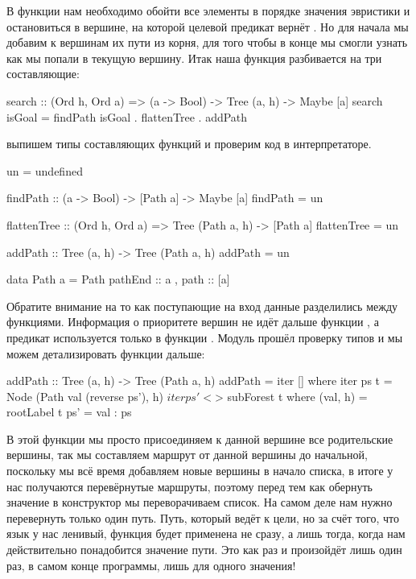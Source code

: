 В функции  нам необходимо обойти все элементы в порядке
значения эвристики и остановиться в вершине, на которой целевой предикат
вернёт . Но для начала мы добавим к вершинам их пути из корня,
для того чтобы в конце мы смогли узнать как мы попали в текущую вершину.
Итак наша функция разбивается на три составляющие:


\begin{code}
search :: (Ord h, Ord a) => (a -> Bool) -> Tree (a, h) -> Maybe [a]
search isGoal =  findPath isGoal . flattenTree . addPath 
\end{code}

выпишем типы составляющих функций и проверим код в интерпретаторе.


\begin{code}
un = undefined

findPath :: (a -> Bool) -> [Path a] -> Maybe [a]
findPath = un

flattenTree :: (Ord h, Ord a) => Tree (Path a, h) -> [Path a]
flattenTree = un

addPath :: Tree (a, h) -> Tree (Path a, h)
addPath = un

data Path a = Path 
	{ pathEnd   :: a
	, path      :: [a]
	}
\end{code}

Обратите внимание на то как поступающие на вход данные разделились между
функциями. Информация о приоритете вершин не идёт дальше функции
, а предикат  используется только в функции
. Модуль прошёл проверку типов и мы можем детализировать
функции дальше:


\begin{code}
addPath :: Tree (a, h) -> Tree (Path a, h)
addPath = iter []
    where iter ps t = Node (Path val (reverse ps'), h) $ 
            iter ps' <$> subForest t
            where (val, h)  = rootLabel t
                  ps'       = val : ps
\end{code}

В этой функции мы просто присоединяем к данной вершине все родительские
вершины, так мы составляем маршрут от данной вершины до начальной,
поскольку мы всё время добавляем новые вершины в начало списка, в итоге
у нас получаются перевёрнутые маршруты, поэтому перед тем как обернуть
значение в конструктор  мы переворачиваем список. На самом деле
нам нужно перевернуть только один путь. Путь, который ведёт к цели, но
за счёт того, что язык у нас ленивый, функция  будет
применена не сразу, а лишь тогда, когда нам действительно понадобится
значение пути. Это как раз и произойдёт лишь один раз, в самом конце
программы, лишь для одного значения!

